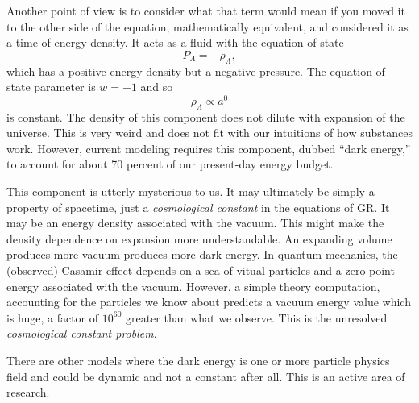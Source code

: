 Another point of view is to consider what that term would mean if you moved it to the other side of the equation, mathematically equivalent, and considered it as a time of energy density.  It acts as a fluid with the equation of state
\begin{equation}
  P_\Lambda = -\rho_\Lambda,
\end{equation}
which has a positive energy density but a negative pressure.  The equation of state parameter is $w=-1$ and so
\begin{equation}
  \rho_\Lambda \propto a^0
\end{equation}
is constant.  The density of this component does not dilute with expansion of the universe.  This is very weird and  does not fit with our intuitions of how substances work.  However, current modeling requires this component, dubbed ``dark energy,'' to account for about 70 percent of our present-day energy budget.

This component is utterly mysterious to us.  It may ultimately be simply a property of spacetime, just a \textit{cosmological constant} in the equations of GR.  It may be an energy density associated with the vacuum.  This might make the density dependence on expansion more understandable.  An expanding volume produces more vacuum produces more dark energy.  In quantum mechanics, the (observed) Casamir effect depends on a sea of vitual particles and a zero-point energy associated with the vacuum.  However, a simple theory computation, accounting for the particles we know about predicts a vacuum energy value which is huge, a factor of $10^{60}$ greater than what we observe.  This is the unresolved \textit{cosmological constant problem}.

There are other models where the dark energy is one or more particle physics field and could be dynamic and not a constant after all.  This is an active area of research.

